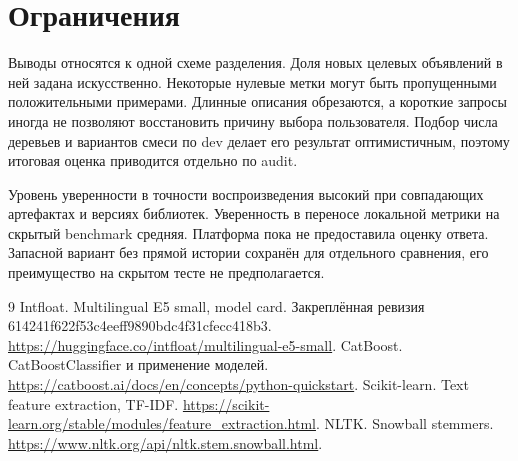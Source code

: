 \documentclass{article}
\begin{document}
\section{Ограничения}

Выводы относятся к одной схеме разделения. Доля новых целевых объявлений в ней задана искусственно. Некоторые нулевые метки могут быть пропущенными положительными примерами. Длинные описания обрезаются, а короткие запросы иногда не позволяют восстановить причину выбора пользователя. Подбор числа деревьев и вариантов смеси по dev делает его результат оптимистичным, поэтому итоговая оценка приводится отдельно по audit.

Уровень уверенности в точности воспроизведения высокий при совпадающих артефактах и версиях библиотек. Уверенность в переносе локальной метрики на скрытый benchmark средняя. Платформа пока не предоставила оценку ответа. Запасной вариант без прямой истории сохранён для отдельного сравнения, его преимущество на скрытом тесте не предполагается.

\begin{thebibliography}{9}
 Intfloat. Multilingual E5 small, model card. Закреплённая ревизия 614241f622f53c4eeff9890bdc4f31cfecc418b3. \url{https://huggingface.co/intfloat/multilingual-e5-small}.
 CatBoost. CatBoostClassifier и применение моделей. \url{https://catboost.ai/docs/en/concepts/python-quickstart}.
 Scikit-learn. Text feature extraction, TF-IDF. \url{https://scikit-learn.org/stable/modules/feature_extraction.html}.
 NLTK. Snowball stemmers. \url{https://www.nltk.org/api/nltk.stem.snowball.html}.
\end{thebibliography}
\end{document}
